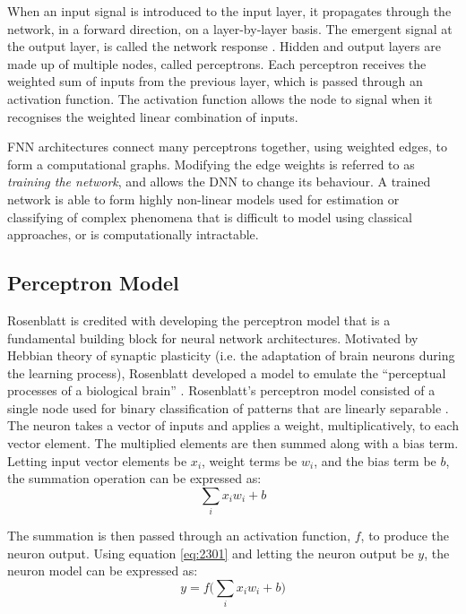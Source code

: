 When an input signal is introduced to the input layer, it propagates through the network, in a forward direction, on a layer-by-layer basis. The emergent signal at the output layer, is called the network response \cite{Haykin99}. Hidden and output layers are made up of multiple nodes, called perceptrons. Each perceptron receives the weighted sum of inputs from the previous layer, which is passed through an activation function. The activation function allows the node to signal when it recognises the weighted linear combination of inputs.

FNN architectures connect many perceptrons together, using weighted edges, to form a computational graphs. Modifying the edge weights is referred to as \textit{training the network}, and allows the DNN to change its behaviour. A trained network is able to form highly non-linear models used for estimation or classifying of complex phenomena that is difficult to model using classical approaches, or is computationally intractable.



\subsection{Perceptron Model}
Rosenblatt is credited with developing the perceptron model that is a fundamental building block for neural network architectures. Motivated by Hebbian theory of synaptic plasticity (i.e. the adaptation of brain neurons during the learning process), Rosenblatt developed a model to emulate the ``perceptual processes of a biological brain'' \cite{Rosenblatt1957}. Rosenblatt's perceptron model consisted of a single node used for binary classification of patterns that are linearly separable \cite{Rosenblatt1958}. The neuron takes a vector of inputs and applies a weight, multiplicatively, to each vector element. The multiplied elements are then summed along with a bias term. Letting input vector elements be $x_i$, weight terms be $w_i$, and the bias term be $b$, the summation operation can be expressed as:
\begin{equation}
	\sum_{i}x_i w_i + b \label{eq:2301}
\end{equation} 

The summation is then passed through an activation function, $f$, to produce the neuron output. Using equation \ref{eq:2301} and letting the neuron output be $y$, the neuron model can be expressed as:
\begin{equation}
	y = f\bigg( \sum_{i}x_i w_i + b \bigg) \label{eq:2302}
\end{equation}

